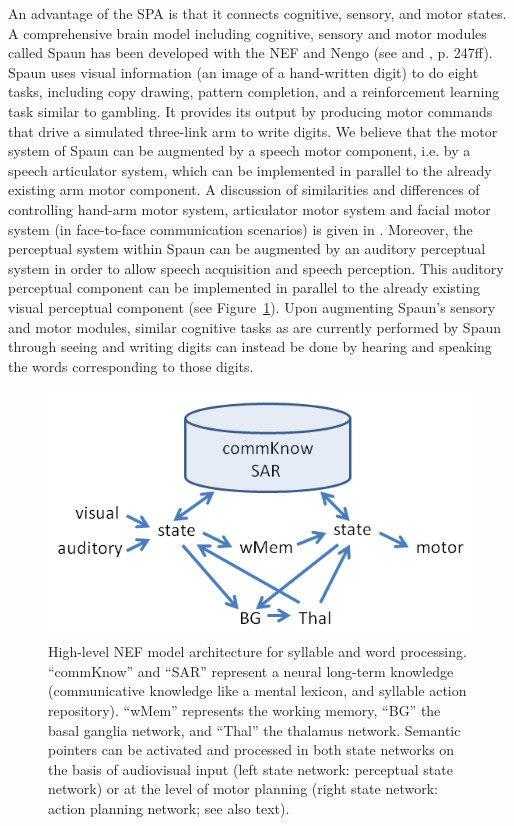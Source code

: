 \documentclass[conference]{IEEEtran}
\begin{document}
An advantage of the SPA is that it connects cognitive,
sensory, and motor states. A comprehensive brain model including
cognitive, sensory and motor modules called Spaun has been
developed with the NEF and Nengo (see \cite{eliasmith2012} and \cite{eliasmith2013}, p. 247ff).
Spaun uses visual information (an image of a hand-written digit)
to do eight tasks, including copy drawing,
pattern completion, and a reinforcement learning task
similar to gambling.
It provides its output by producing motor commands that
drive a simulated three-link arm to write digits.
We believe that the motor system of Spaun
can be augmented by a speech motor component, i.e. by a speech
articulator system, which can be implemented in parallel to the
already existing arm motor component. A discussion of similarities
and differences of controlling hand-arm motor system, articulator
motor system and facial motor system (in face-to-face communication
scenarios) is given in \cite{kroger2010}. Moreover, the perceptual
system within Spaun can be augmented by an auditory perceptual system
in order to allow speech acquisition and speech perception. This
auditory perceptual component can be implemented in parallel to the
already existing visual perceptual component (see
Figure~\ref{fig:model}).
Upon augmenting Spaun's sensory and motor modules,
similar cognitive tasks as are currently performed by Spaun
through seeing and writing digits
can instead be done by hearing and speaking
the words corresponding to those digits.

\begin{figure}[!t]
\centering
\includegraphics[width=\columnwidth]{model}
\caption{High-level NEF model architecture for syllable and word processing.
  ``commKnow'' and ``SAR'' represent a neural long-term knowledge
  (communicative knowledge like a mental lexicon, and syllable action
  repository). ``wMem'' represents the working memory, ``BG'' the
  basal ganglia network, and ``Thal'' the thalamus
  network. Semantic pointers can be activated and processed in both
  state networks on the basis of audiovisual input (left state
  network: perceptual state network) or at the level of motor planning
  (right state network: action planning network; see also text).}
\label{fig:model}
\end{figure}
\end{document}

